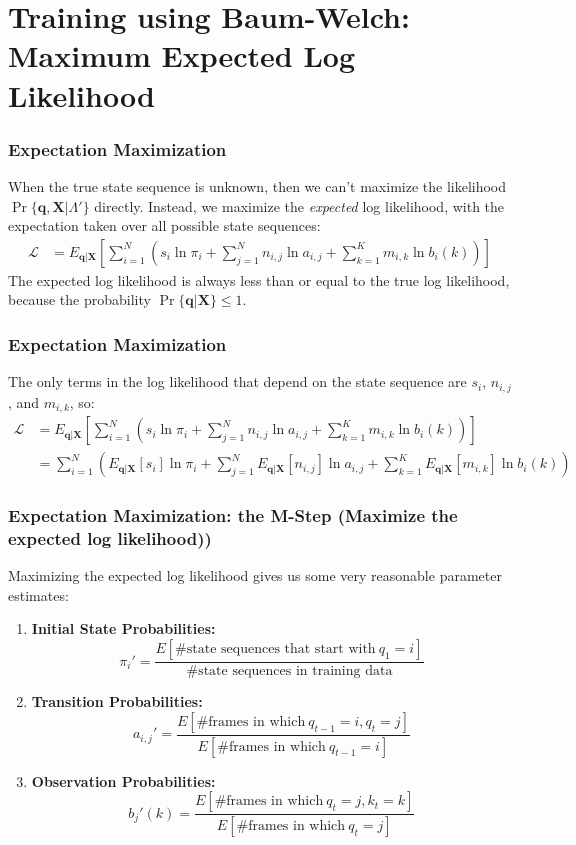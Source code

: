 \documentclass{beamer}
\begin{document}
  
\section[Baum-Welch]{Training using Baum-Welch: Maximum Expected Log Likelihood}
\setcounter{subsection}{1}

\begin{frame}
  \frametitle{Expectation Maximization}

  When the true state sequence is unknown, then we can't maximize the
  likelihood $\Pr\{\mathbf{q},\mathbf{X}|\Lambda'\}$ directly.  Instead,
  we maximize the {\em expected} log likelihood, with the expectation
  taken over all possible state sequences:
  \begin{align*}
    {\mathcal L}
    &= E_{\mathbf{q}|\mathbf{X}}\left[
      \sum_{i=1}^N\left(s_i\ln\pi_{i}+\sum_{j=1}^N n_{i,j}\ln a_{i,j} + \sum_{k=1}^Km_{i,k}\ln b_i(k)\right)
      \right]
  \end{align*}
  The expected log likelihood is always less than or equal to the true
  log likelihood, because the probability
  $\Pr\{\mathbf{q}|\mathbf{X}\}\le 1$.
\end{frame}

\begin{frame}
  \frametitle{Expectation Maximization}

  The only terms in the log likelihood that depend on the state
  sequence are $s_i$, $n_{i,j}$, and $m_{i,k}$, so:
  \begin{align*}
    {\mathcal L}
    &= E_{\mathbf{q}|\mathbf{X}}\left[
      \sum_{i=1}^N\left(s_i\ln\pi_{i}+\sum_{j=1}^N n_{i,j}\ln a_{i,j} + \sum_{k=1}^Km_{i,k}\ln b_i(k)\right)
      \right]\\
    &= 
    \sum_{i=1}^N\left(E_{\mathbf{q}|\mathbf{X}}\left[s_i\right]\ln\pi_{i} +
    \sum_{j=1}^N E_{\mathbf{q}|\mathbf{X}}\left[n_{i,j}\right]\ln a_{i,j} +
    \sum_{k=1}^KE_{\mathbf{q}|\mathbf{X}}\left[m_{i,k}\right]\ln b_i(k)\right)
  \end{align*}
\end{frame}

\begin{frame}
  \frametitle{Expectation Maximization: the M-Step (Maximize the expected log likelihood))}

  Maximizing the expected log likelihood gives us some very reasonable parameter estimates:
  \begin{enumerate}
  \item {\bf Initial State Probabilities:}
    \[
    \pi_i'=\frac{E\left[\mbox{\# state sequences that start with}~q_1=i\right]}{\mbox{\# state sequences in training data}}
    \]
  \item {\bf Transition Probabilities:}
    \[
    a_{i,j}'=\frac{E\left[\mbox{\# frames in which}~q_{t-1}=i,q_t=j\right]}{E\left[\mbox{\# frames in which}~q_{t-1}=i\right]}
    \]
  \item {\bf Observation Probabilities:} 
    \[
    b_j'(k)=\frac{E\left[\mbox{\# frames in which}~q_t=j,k_t=k\right]}{E\left[\mbox{\# frames in which}~q_{t}=j\right]}
    \]
  \end{enumerate}
\end{frame}
\end{document}
